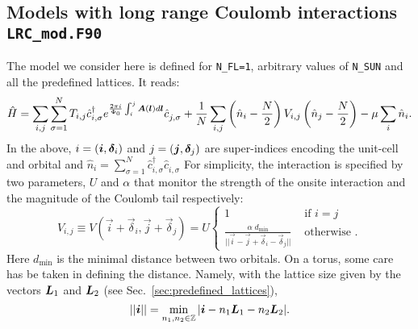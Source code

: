 

\subsection{Models with long range Coulomb interactions \texttt{LRC\_mod.F90}}


The model we consider  here is  defined  for \texttt{N\_FL=1},  arbitrary values of \texttt{N\_SUN}  and  all the predefined lattices.  It  reads: 
\begin{equation}
\hat{H}=  \sum_{i,j}  \sum_{\sigma =1}^{N}  T_{i, j}    \hat{c}^{\dagger}_{i, \sigma }   e^{\frac{2 \pi i}{\Phi_0} \int_{i}^{j}  
     \boldsymbol{A}(\boldsymbol{l})  d \boldsymbol{l}} \hat{c}^{}_{j,\sigma}   +
     \frac{1} { N } \sum_{i,j}  \left(  \hat{n}_{i} -  \frac{N}{2}  \right)  V_{i,j} \left(  \hat{n}_{j} -  \frac{N}{2}  \right)
      - \mu \sum_{i} \hat{n}_{i}.
\end{equation}
In the above, $i = (\boldsymbol{i}, \boldsymbol{\delta}_i) $  and $j = (\boldsymbol{j}, \boldsymbol{\delta}_j) $  are super-indices encoding the unit-cell and orbital and 
$  \hat{n}_{i} = \sum_{\sigma =1}^{N} \hat{c}^{\dagger}_{i,\sigma } \hat{c}^{\phantom\dagger}_{i,\sigma} $ For simplicity, the interaction is specified by  two  parameters, $U$ and $\alpha$ that monitor the  strength of the onsite interaction and the magnitude of the Coulomb tail  respectively:
\begin{equation}
	V_{i, j}     \equiv V(\vec{i}  + \vec{\delta}_i ,  \vec{j}  + \vec{\delta}_j  )  =   U \left\{
	\begin{array}{ll}  
	1          &   \text{ if }  i = j    \\
	\frac{\alpha   \;   d_\mathrm{min}}{  {  || \vec{i} - \vec{j} + \vec{\delta}_i - \vec{\delta}_j  ||}   } &     \text{ otherwise }.
	\end{array}
\right.
\end{equation}
Here $d_\mathrm{min}$ is the minimal distance between two orbitals.      On a  torus, some care  has be taken in  defining the distance. Namely, with the lattice size given by the vectors $\boldsymbol{L}_1$  and  $\boldsymbol{L}_2$  (see Sec.~\ref{sec:predefined_lattices}),
\begin{equation}
	|| \boldsymbol{i} || = \min_{n_1,n_2 \in \mathbb{Z} }  | \boldsymbol{i} - n_1 \boldsymbol{L}_1 -  n_2 \boldsymbol{L}_2 | .
\end{equation}
